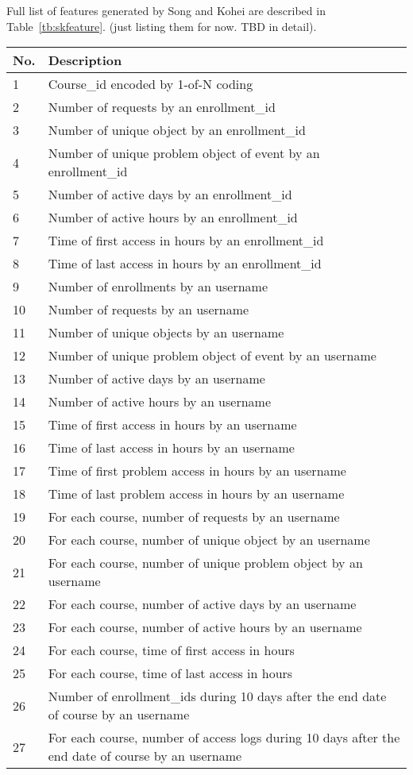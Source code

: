 Full list of features generated by Song and Kohei are described in Table~\ref{tb:skfeature}.
(just listing them for now. TBD in detail).

\begin{center}
  \begin{table*}[ht]
    \begin{minipage}{\textwidth}
    {
      \small
      \hfill{}
      \begin{tabular}{|l|l|}
      \hline
      \textbf{No.}&\textbf{Description}\tabularnewline \hline
      1 & Course\_id encoded by 1-of-N coding \tabularnewline
      2 & Number of requests by an enrollment\_id \tabularnewline
      3 & Number of unique object by an enrollment\_id \tabularnewline
      4 & Number of unique problem object of event by an enrollment\_id \tabularnewline
      5 & Number of active days by an enrollment\_id \tabularnewline
      6 & Number of active hours by an enrollment\_id \tabularnewline
      7 & Time of first access in hours by an enrollment\_id \tabularnewline
      8 & Time of last access in hours by an enrollment\_id \tabularnewline
      9 & Number of enrollments by an username \tabularnewline
      10 & Number of requests by an username \tabularnewline
      11 & Number of unique objects by an username \tabularnewline
      12 & Number of unique problem object of event by an username \tabularnewline
      13 & Number of active days by an username \tabularnewline
      14 & Number of active hours by an username \tabularnewline
      15 & Time of first access in hours by an username \tabularnewline
      16 & Time of last access in hours by an username \tabularnewline
      17 & Time of first problem access in hours by an username \tabularnewline
      18 & Time of last problem access in hours by an username \tabularnewline
      19 & For each course, number of requests by an username \tabularnewline
      20 & For each course, number of unique object by an username \tabularnewline
      21 & For each course, number of unique problem object by an username \tabularnewline
      22 & For each course, number of active days by an username \tabularnewline
      23 & For each course, number of active hours by an username \tabularnewline
      24 & For each course, time of first access in hours \tabularnewline
      25 & For each course, time of last access in hours \tabularnewline
      26 & Number of enrollment\_ids during 10 days after the end date of course by an username \tabularnewline
      27 & For each course, number of access logs during 10 days after the end date of course by an username \tabularnewline

\end{tabular}}
\end{minipage}
\end{table*}
\end{center}

